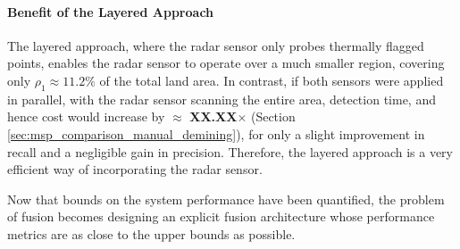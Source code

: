         \paragraph{Benefit of the Layered Approach}
        
            The layered approach, where the radar sensor only probes thermally flagged points, enables the radar sensor to operate over a much smaller region, covering only $\rho_1 \approx 11.2\%$ of the total land area. In contrast, if both sensors were applied in parallel, with the radar sensor scanning the entire area, detection time, and hence cost would increase by 
            $\approx$ \textbf{XX.XX}$\times$ (Section \ref{sec:msp_comparison_manual_demining}), for only a slight improvement in recall and a negligible gain in precision. Therefore, the layered approach is a very efficient way of incorporating the radar sensor. 

            Now that bounds on the system performance have been quantified, the problem of fusion becomes designing an explicit fusion architecture whose performance metrics are as close to the upper bounds as possible.
            

        